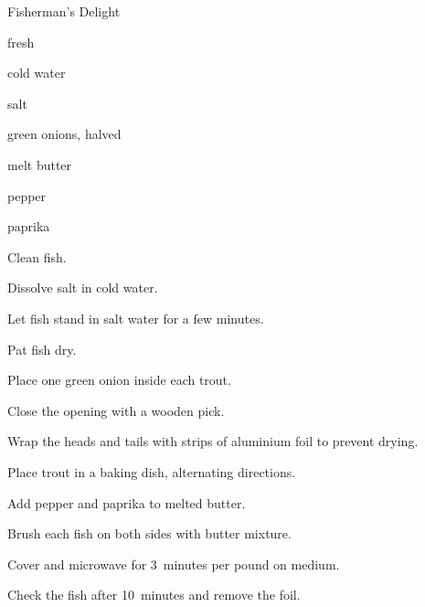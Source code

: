 \begin{recipe}{Fisherman's Delight}{}{}

\begin{ingredients}
\item fresh 
\item {} cold water
\item \C{\quarter} salt
\item green onions, halved
\item melt butter
\item pepper
\item paprika
\end{ingredients}

\begin{directions}
\item Clean fish.
\item Dissolve salt in cold water.
\item Let fish stand in salt water for a few minutes.
\item Pat fish dry.
\item Place one green onion inside each trout.
\item Close the opening with a wooden pick.
\item Wrap the heads and tails with strips of aluminium foil to prevent drying.
\item Place trout in a baking dish, alternating directions.
\item Add pepper and paprika to melted butter.
\item Brush each fish on both sides with butter mixture.
\item Cover and microwave for 3~minutes per pound on medium.
\item Check the fish after 10~minutes and remove the foil.
\end{directions}

\end{recipe}
